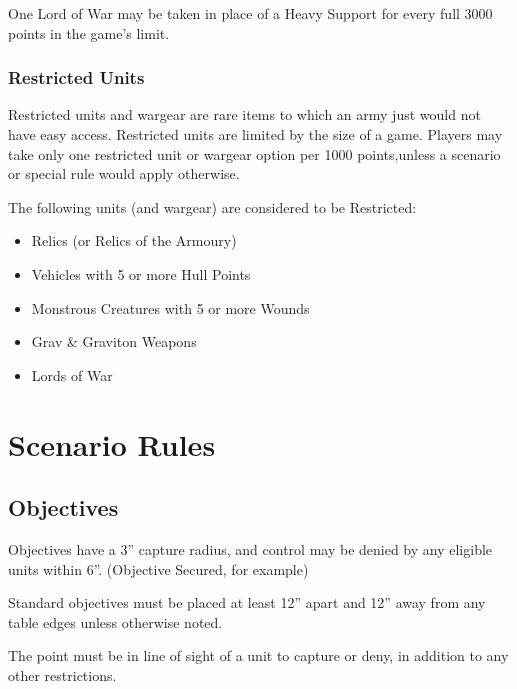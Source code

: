 \documentclass[letterpaper,twocolumn,oneside,titlepage]{book}
\providecommand{\tightlist}{%
  \setlength{\itemsep}{0pt}\setlength{\parskip}{0pt}}
\begin{document}
One Lord of War may be taken in place of a Heavy Support for every full
3000 points in the game's limit.

\subsection{\texorpdfstring{\textbf{Restricted
Units}}{Restricted Units}}\label{restricted-units}

Restricted units and wargear are rare items to which an army just would
not have easy access. Restricted units are limited by the size of a
game. Players may take only one restricted unit or wargear option per
1000 points,unless a scenario or special rule would apply otherwise.

The following units (and wargear) are considered to be Restricted:

\begin{itemize}
\tightlist
\item
  Relics (or Relics of the Armoury)\\
\item
  Vehicles with 5 or more Hull Points\\
\item
  Monstrous Creatures with 5 or more Wounds\\
\item
  Grav \& Graviton Weapons\\
\item
  Lords of War
\end{itemize}

\chapter{\texorpdfstring{\textbf{Scenario
Rules}}{Scenario Rules}}\label{scenario-rules}

\section{\texorpdfstring{\textbf{Objectives}}{Objectives}}\label{objectives}

Objectives have a 3'' capture radius, and control may be denied by any
eligible units within 6''. (Objective Secured, for example)

Standard objectives must be placed at least 12'' apart and 12'' away
from any table edges unless otherwise noted.

The point must be in line of sight of a unit to capture or deny, in
addition to any other restrictions.
\end{document}
